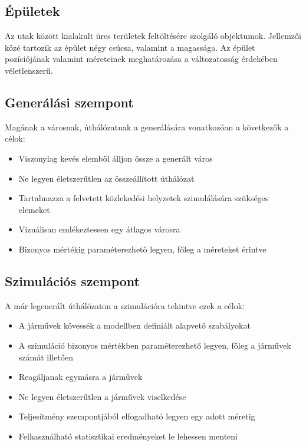 \subsection{Épületek}
Az utak között kialakult üres területek feltöltésére szolgáló objektumok. Jellemzői közé tartozik az épület négy csúcsa, valamint a magassága. Az épület pozíciójának valamint méreteinek meghatározása a változatosság érdekében 
véletlenszerű.
\subsection{Generálási szempont}
Magának a városnak, úthálózatnak a generálására vonatkozóan a következők a célok:
\begin{itemize}
\item Viszonylag kevés elemből álljon össze a generált város
\item Ne legyen életszerűtlen az összeállított úthálózat
\item Tartalmazza a felvetett közlekedési helyzetek szimulálására szükséges elemeket
\item Vizuálisan emlékeztessen egy átlagos városra
\item Bizonyos mértékig paraméterezhető legyen, főleg a méreteket érintve
\end{itemize}
\subsection{Szimulációs szempont}
A már legenerált úthálózaton a szimulációra tekintve ezek a célok:
\begin{itemize}
\item A járművek kövessék a modellben definiált alapvető szabályokat
\item A szimuláció bizonyos mértékben paraméterezhető legyen, főleg a járművek számát illetően
\item Reagáljanak egymásra a járművek
\item Ne legyen életszerűtlen a járművek viselkedése
\item Teljesítmény szempontjából elfogadható legyen egy adott méretig
\item Felhasználható statisztikai eredményeket le lehessen menteni
\end{itemize}